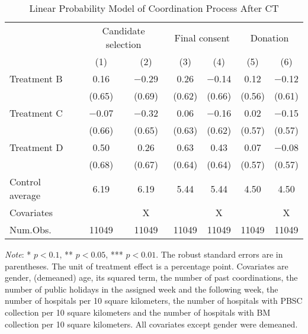 \documentclass[12pt, a4paper]{article}
\begin{document}
\begin{table}

\caption{\label{tab:lm-coordinate}Linear Probability Model of Coordination Process After CT}
\centering
\fontsize{8}{10}\selectfont
\begin{threeparttable}
\begin{tabular}[t]{lcccccc}
\toprule
\multicolumn{1}{c}{ } & \multicolumn{2}{c}{Candidate selection} & \multicolumn{2}{c}{Final consent} & \multicolumn{2}{c}{Donation} \\
\cmidrule(l{3pt}r{3pt}){2-3} \cmidrule(l{3pt}r{3pt}){4-5} \cmidrule(l{3pt}r{3pt}){6-7}
  & (1) & (2) & (3) & (4) & (5) & (6)\\
\midrule
Treatment B & \num{0.16} & \num{-0.29} & \num{0.26} & \num{-0.14} & \num{0.12} & \num{-0.12}\\
 & (\num{0.65}) & (\num{0.69}) & (\num{0.62}) & (\num{0.66}) & (\num{0.56}) & (\num{0.61})\\
Treatment C & \num{-0.07} & \num{-0.32} & \num{0.06} & \num{-0.16} & \num{0.02} & \num{-0.15}\\
 & (\num{0.66}) & (\num{0.65}) & (\num{0.63}) & (\num{0.62}) & (\num{0.57}) & (\num{0.57})\\
Treatment D & \num{0.50} & \num{0.26} & \num{0.63} & \num{0.43} & \num{0.07} & \num{-0.08}\\
 & (\num{0.68}) & (\num{0.67}) & (\num{0.64}) & (\num{0.64}) & (\num{0.57}) & (\num{0.57})\\
\midrule
Control average & 6.19 & 6.19 & 5.44 & 5.44 & 4.50 & 4.50\\
Covariates &  & X &  & X &  & X\\
Num.Obs. & \num{11049} & \num{11049} & \num{11049} & \num{11049} & \num{11049} & \num{11049}\\
\bottomrule
\end{tabular}
\begin{tablenotes}
\item \emph{Note}: * $p < 0.1$, ** $p < 0.05$, *** $p < 0.01$. The robust standard errors are in parentheses. The unit of treatment effect is a percentage point. Covariates are gender, (demeaned) age, its squared term, the number of past coordinations, the number of public holidays in the assigned week and the following week, the number of hospitals per 10 square kilometers, the number of hospitals with PBSC collection per 10 square kilometers and the number of hospitals with BM collection per 10 square kilometers. All covariates except gender were demeaned.
\end{tablenotes}
\end{threeparttable}
\end{table}
\end{document}
